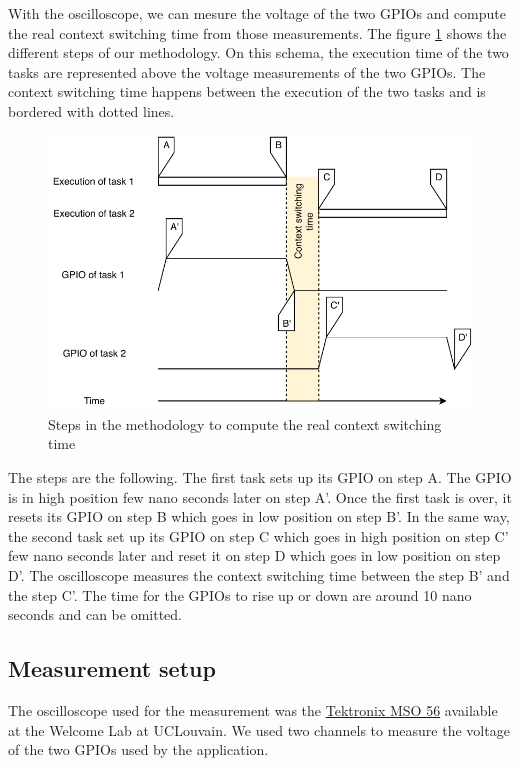 With the oscilloscope, we can mesure the voltage of the two GPIOs and compute the real context switching time from those measurements.
The figure \ref{fig:real-context-switching-time-measurement} shows the different steps of our methodology.
On this schema, the execution time of the two tasks are represented above the voltage measurements of the two GPIOs.
The context switching time happens between the execution of the two tasks and is bordered with dotted lines.

\begin{figure}[!ht]
  \centering
  \includegraphics[scale=1]{assets/real-context-switching-time-measurement.pdf}
  \caption{\label{fig:real-context-switching-time-measurement}Steps in the methodology to compute the real context switching time}
\end{figure}

The steps are the following.
The first task sets up its GPIO on step A.
The GPIO is in high position few nano seconds later on step A'.
Once the first task is over, it resets its GPIO on step B which goes in low position on step B'.
In the same way, the second task set up its GPIO on step C which goes in high position on step C' few nano seconds later and reset it on step D which goes in low position on step D'.
The oscilloscope measures the context switching time between the step B' and the step C'.
The time for the GPIOs to rise up or down are around 10 nano seconds and can be omitted.


\subsection{Measurement setup}

The oscilloscope used for the measurement was the \href{https://www.tek.com/oscilloscope/mso56}{Tektronix MSO 56} available at the Welcome Lab at UCLouvain.
We used two channels to measure the voltage of the two GPIOs used by the application.

